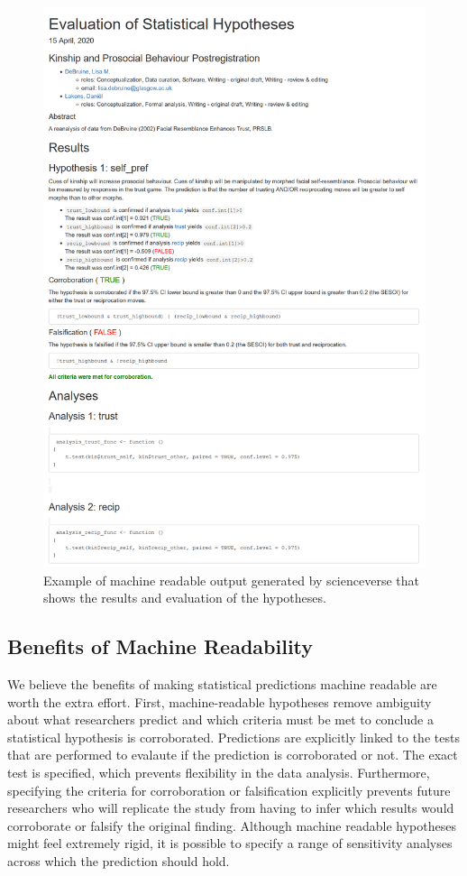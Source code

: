 \documentclass[
  english,
  doc,floatsintext]{apa6}
\begin{document}
\begin{figure}[htbp]
\centering
\includegraphics{images/output.png}
\caption{Example of machine readable output generated by scienceverse that shows the results and evaluation of the hypotheses. \label{fig1}}
\end{figure}

\hypertarget{benefits-of-machine-readability}{%
\subsection{Benefits of Machine Readability}\label{benefits-of-machine-readability}}

We believe the benefits of making statistical predictions machine readable are worth the extra effort. First, machine-readable hypotheses remove ambiguity about what researchers predict and which criteria must be met to conclude a statistical hypothesis is corroborated. Predictions are explicitly linked to the tests that are performed to evalaute if the prediction is corroborated or not. The exact test is specified, which prevents flexibility in the data analysis. Furthermore, specifying the criteria for corroboration or falsification explicitly prevents future researchers who will replicate the study from having to infer which results would corroborate or falsify the original finding. Although machine readable hypotheses might feel extremely rigid, it is possible to specify a range of sensitivity analyses across which the prediction should hold.
\end{document}
